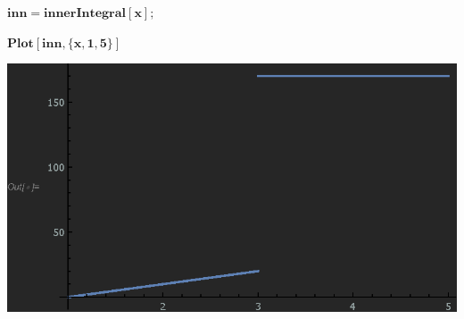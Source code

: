 \documentclass{article}
\begin{document}
\begin{doublespace}
\noindent\(\pmb{\text{inn} = \text{innerIntegral}[x];}\)
\end{doublespace}

\begin{doublespace}
\noindent\(\pmb{\text{Plot}[\text{inn},\{x,1,5\}]}\)
\end{doublespace}

\includegraphics{AnalyticalHW4_gr2.eps}
\end{document}
